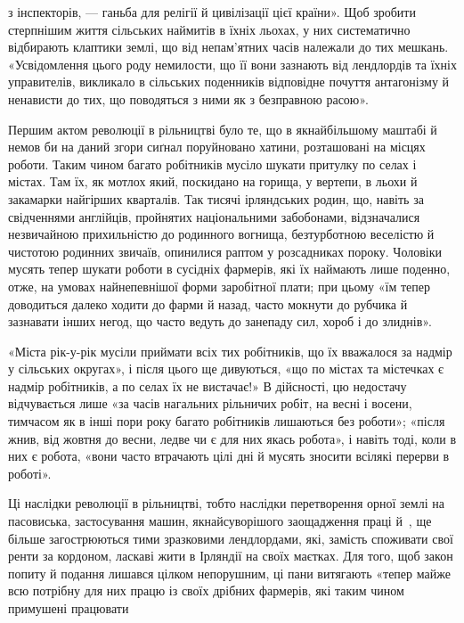 \parcont{}  %
з інспекторів, — ганьба для релігії й цивілізації цієї країни».
Щоб зробити стерпнішим життя сільських наймитів в їхніх льохах,
у них систематично відбирають клаптики землі, що від непам’ятних
часів належали до тих мешкань. «Усвідомлення цього
роду немилости, що її вони зазнають від лендлордів та їхніх управителів,
викликало в сільських поденників відповідне почуття
антагонізму й ненависти до тих, що поводяться з ними як з безправною
расою».

Першим актом революції в рільництві було те, що в якнайбільшому
маштабі й немов би на даний згори сиґнал поруйновано
хатини, розташовані на місцях роботи. Таким чином багато робітників
мусіло шукати притулку по селах і містах. Там їх, як
мотлох який, поскидано на горища, у вертепи, в льохи й закамарки
найгірших кварталів. Так тисячі ірляндських родин, що,
навіть за свідченнями англійців, пройнятих національними забобонами,
відзначалися незвичайною прихильністю до родинного
вогнища, безтурботною веселістю й чистотою родинних звичаїв,
опинилися раптом у розсадниках пороку. Чоловіки мусять тепер
шукати роботи в сусідніх фармерів, які їх наймають лише поденно,
отже, на умовах найнепевнішої форми заробітної плати;
при цьому «їм тепер доводиться далеко ходити до фарми й назад,
часто мокнути до рубчика й зазнавати інших негод, що часто
ведуть до занепаду сил, хороб і до злиднів».

«Міста рік-у-рік мусіли приймати всіх тих робітників, що
їх вважалося за надмір у сільських округах», і після цього
ще дивуються, «що по містах та містечках є надмір робітників,
а по селах їх не вистачає!» В дійсності, цю недостачу відчувається
лише «за часів нагальних рільничих робіт, на весні
і восени, тимчасом як в інші пори року багато робітників лишаються
без роботи»; «після жнив, від жовтня до весни, ледве
чи є для них якась робота», і навіть тоді, коли в них є робота,
«вони часто втрачають цілі дні й мусять зносити всілякі
перерви в роботі».

Ці наслідки революції в рільництві, тобто наслідки перетворення
орної землі на пасовиська, застосування машин, якнайсуворішого
заощадження праці й~, ще більше загострюються
тими зразковими лендлордами, які, замість споживати свої ренти
за кордоном, ласкаві жити в Ірляндії на своїх маєтках. Для того,
щоб закон попиту й подання лишався цілком непорушним, ці
пани витягають «тепер майже всю потрібну для них працю із
своїх дрібних фармерів, які таким чином примушені працювати
\parbreak{}  %
